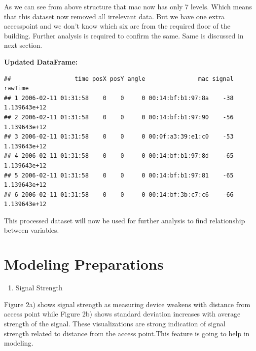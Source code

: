 \documentclass[
]{article}
\providecommand{\tightlist}{%
  \setlength{\itemsep}{0pt}\setlength{\parskip}{0pt}}
\begin{document}
As we can see from above structure that mac now has only 7 levels. Which
means that this dataset now removed all irrelevant data. But we have one
extra accesspoint and we don't know which six are from the required
floor of the building. Further analysis is required to confirm the same.
Same is discussed in next section.

\textbf{Updated DataFrame:}

\begin{verbatim}
##                  time posX posY angle               mac signal      rawTime
## 1 2006-02-11 01:31:58    0    0     0 00:14:bf:b1:97:8a    -38 1.139643e+12
## 2 2006-02-11 01:31:58    0    0     0 00:14:bf:b1:97:90    -56 1.139643e+12
## 3 2006-02-11 01:31:58    0    0     0 00:0f:a3:39:e1:c0    -53 1.139643e+12
## 4 2006-02-11 01:31:58    0    0     0 00:14:bf:b1:97:8d    -65 1.139643e+12
## 5 2006-02-11 01:31:58    0    0     0 00:14:bf:b1:97:81    -65 1.139643e+12
## 6 2006-02-11 01:31:58    0    0     0 00:14:bf:3b:c7:c6    -66 1.139643e+12
\end{verbatim}

This processed dataset will now be used for further analysis to find
relationship between variables.

\newpage

\hypertarget{modeling-preparations}{%
\section{Modeling Preparations}\label{modeling-preparations}}

\begin{enumerate}
\def\labelenumi{\arabic{enumi}.}
\tightlist
\item
  Signal Strength
\end{enumerate}

Figure 2a) shows signal strength as measuring device weakens with
distance from access point while Figure 2b) shows standard deviation
increases with average strength of the signal. These visualizations are
strong indication of signal strength related to distance from the access
point.This feature is going to help in modeling.
\end{document}
